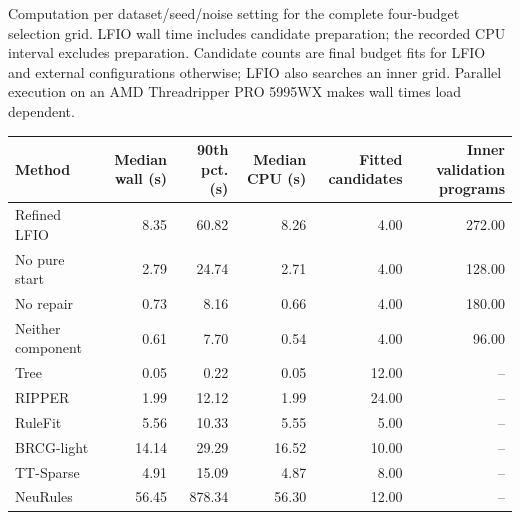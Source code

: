 \begin{kbtable}
\centering
\caption{Computation per dataset/seed/noise setting for the complete four-budget selection grid. LFIO wall time includes candidate preparation; the recorded CPU interval excludes preparation. Candidate counts are final budget fits for LFIO and external configurations otherwise; LFIO also searches an inner grid. Parallel execution on an AMD Threadripper PRO 5995WX makes wall times load dependent.}
\label{tab:strength_runtime}
\small
\begin{adjustbox}{max width=\linewidth}
\begin{tabular}{lrrrrr}
\toprule
Method & Median wall (s) & 90th pct. (s) & Median CPU (s) & Fitted candidates & Inner validation programs \\
\midrule
Refined LFIO & 8.35 & 60.82 & 8.26 & 4.00 & 272.00 \\
No pure start & 2.79 & 24.74 & 2.71 & 4.00 & 128.00 \\
No repair & 0.73 & 8.16 & 0.66 & 4.00 & 180.00 \\
Neither component & 0.61 & 7.70 & 0.54 & 4.00 & 96.00 \\
Tree & 0.05 & 0.22 & 0.05 & 12.00 & -- \\
RIPPER & 1.99 & 12.12 & 1.99 & 24.00 & -- \\
RuleFit & 5.56 & 10.33 & 5.55 & 5.00 & -- \\
BRCG-light & 14.14 & 29.29 & 16.52 & 10.00 & -- \\
TT-Sparse & 4.91 & 15.09 & 4.87 & 8.00 & -- \\
NeuRules & 56.45 & 878.34 & 56.30 & 12.00 & -- \\
\bottomrule
\end{tabular}
\end{adjustbox}
\end{kbtable}

